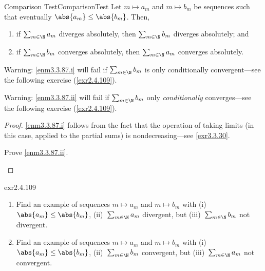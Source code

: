 \begin{prp}{Comparison Test}{ComparisonTest}
Let $m\mapsto a_m$ and $m\mapsto b_m$ be sequences such that eventually $\abs{a_m}\leq \abs{b_m}$.  Then,
\begin{enumerate}
\item \label{enm3.3.87.i}if $\sum _{m\in \N}a_m$ diverges absolutely, then $\sum _{m\in \N}b_m$ diverges absolutely; and
\item \label{enm3.3.87.ii}if $\sum _{m\in \N}b_m$ converges absolutely, then $\sum _{m\in \N}a_m$ converges absolutely.
\end{enumerate}
\begin{wrn}
Warning:  \cref{enm3.3.87.i} will fail if $\sum _{m\in \N}b_m$ is only conditionally convergent---see the following exercise (\cref{exr2.4.109}).
\end{wrn}
\begin{wrn}
Warning:  \cref{enm3.3.87.ii} will fail if $\sum _{m\in \N}b_m$ only \emph{conditionally} converges---see the following exercise (\cref{exr2.4.109}).
\end{wrn}
\begin{proof}
\cref{enm3.3.87.i} follows from the fact that the operation of taking limits (in this case, applied to the partial sums) is nondecreasing---see \cref{exr3.3.30}.
\begin{exr}[breakable=false]{}{}
Prove \cref{enm3.3.87.ii}.
\end{exr}
\end{proof}
\end{prp}
\begin{exr}{}{exr2.4.109}
\begin{enumerate}
\item Find an example of sequences $m\mapsto a_m$ and $m\mapsto b_m$ with (i)~$\abs{a_m}\leq \abs{b_m}$, (ii)~$\sum _{m\in \N}a_m$ divergent, but (iii)~$\sum _{m\in \N}b_m$ not divergent.
\item Find an example of sequences $m\mapsto a_m$ and $m\mapsto b_m$ with (i)~$\abs{a_m}\leq \abs{b_m}$, (ii)~$\sum _{m\in \N}b_m$ convergent, but (iii)~$\sum _{m\in \N}a_m$ not convergent.
\end{enumerate}
\end{exr}
